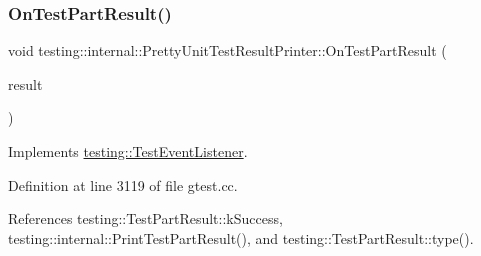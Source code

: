 \subsubsection{\texorpdfstring{On\+Test\+Part\+Result()}{OnTestPartResult()}}
{\footnotesize\ttfamily void testing\+::internal\+::\+Pretty\+Unit\+Test\+Result\+Printer\+::\+On\+Test\+Part\+Result (\begin{DoxyParamCaption}\item[{const \hyperlink{classtesting_1_1TestPartResult}{Test\+Part\+Result} \&}]{result }\end{DoxyParamCaption})\hspace{0.3cm}{\ttfamily [virtual]}}



Implements \hyperlink{classtesting_1_1TestEventListener_a054f8705c883fa120b91473aff38f2ee}{testing\+::\+Test\+Event\+Listener}.



Definition at line 3119 of file gtest.\+cc.



References testing\+::\+Test\+Part\+Result\+::k\+Success, testing\+::internal\+::\+Print\+Test\+Part\+Result(), and testing\+::\+Test\+Part\+Result\+::type().


